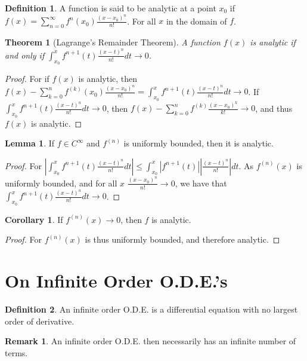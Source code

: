 \documentclass[oneside]{book}
\newtheorem{theorem}{Theorem}[section]
\theoremstyle{definition}
\newtheorem{definition}{Definition}[section]
\newtheorem{lemma}{Lemma}[section]
\newtheorem{corollary}{Corollary}[section]
\newtheorem{remark}{Remark}[section]
\begin{document}
\begin{definition}
A function is said to be analytic at a point $x_0$ if $f(x) = \sum_{n=0}^{\infty} f^{n}(x_0) \frac{(x-x_0)^{n}}{n!}$. For all $x$ in the domain of $f$.
\end{definition}

\begin{theorem}[Lagrange's Remainder Theorem]
A function $f(x)$ is analytic if and only if $\int_{x_0}^{x}f^{n+1}(t)\frac{(x-t)^n}{n!}dt\rightarrow 0$.
\end{theorem}
\begin{proof}
For if $f(x)$ is analytic, then $f(x)-\sum_{k=0}^{n} f^{(k)}(x_0)\frac{(x-x_0)^n}{n!} = \int_{x_0}^{x}f^{n+1}(t)\frac{(x-t)^n}{n!}dt \rightarrow 0$. If $\int_{x_0}^{x}f^{n+1}(t)\frac{(x-t)^n}{n!}dt\rightarrow 0$, then $f(x)-\sum_{k=0}^{n}f^{(k)}\frac{(x-x_0)^{k}}{k!}\rightarrow 0$, and thus $f(x)$ is analytic.
\end{proof}

\begin{lemma}
If $f\in C^{\infty}$ and $f^{(n)}$ is uniformly bounded, then it is analytic.
\end{lemma}
\begin{proof}
For $|\int_{x_0}^{x}f^{n+1}(t)\frac{(x-t)^n}{n!}dt|\leq \int_{x_0}^{x}|f^{n+1}(t)||\frac{(x-t)^n}{n!}|dt$. As $f^{(n)}(x)$ is uniformly bounded, and for all $x$ $\frac{(x-x_0)^n}{n!} \rightarrow 0$, we have that $\int_{x_0}^{x}f^{n+1}(t)\frac{(x-t)^n}{n!}dt\rightarrow 0$.
\end{proof}

\begin{corollary}
If $f^{(n)}(x)\rightarrow 0$, then $f$ is analytic.
\end{corollary}
\begin{proof}
For $f^{(n)}(x)$ is thus uniformly bounded, and therefore analytic.
\end{proof}

\section{On Infinite Order O.D.E.'s}

\begin{definition}
An infinite order O.D.E. is a differential equation with no largest order of derivative.
\end{definition}

\begin{remark}
An infinite order O.D.E. then necessarily has an infinite number of terms.
\end{remark}
\end{document}
